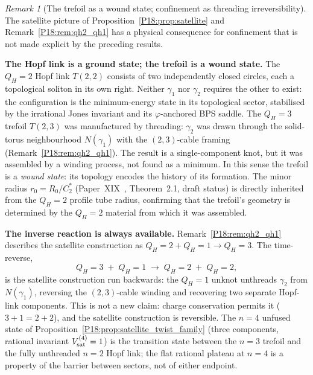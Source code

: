 \documentclass[11pt,a4paper]{article}
\theoremstyle{definition}\newtheorem{definition}[theorem]{Definition}
\theoremstyle{remark}
\newtheorem{remark}[theorem]{Remark}
\newcommand{\vp}{\varphi}
\newcommand{\QH}{Q_H}
\newcommand{\Jones}{V}
\begin{document}
\begin{remark}[The trefoil as a wound state; confinement as threading irreversibility]
\label{P18:rem:wound_state}
The satellite picture of Proposition~\ref{P18:prop:satellite} and
Remark~\ref{P18:rem:qh2_qh1} has a physical consequence for
confinement that is not made explicit by the preceding results.

\textbf{The Hopf link is a ground state; the trefoil is a wound state.}
The $\QH=2$ Hopf link $T(2,2)$ consists of two independently
closed circles, each a topological soliton in its own right.
Neither $\gamma_1$ nor $\gamma_2$ requires the other to exist:
the configuration is the minimum-energy state in its topological
sector, stabilised by the irrational Jones invariant and its
$\vp$-anchored BPS saddle.
The $\QH=3$ trefoil $T(2,3)$ was manufactured by threading:
$\gamma_2$ was drawn through the solid-torus neighbourhood
$N(\gamma_1)$ with the $(2,3)$-cable framing
(Remark~\ref{P18:rem:qh2_qh1}).  The result is a single-component
knot, but it was assembled by a winding process, not found as a
minimum.  In this sense the trefoil is a \emph{wound state}: its
topology encodes the history of its formation.  The minor radius
$r_0=R_0/C_2^*$ (Paper~XIX~\cite{Paper19}, Theorem~2.1, %
draft status) is directly inherited from the $\QH=2$
profile tube radius, confirming that the trefoil's geometry is
determined by the $\QH=2$ material from which it was assembled.

\textbf{The inverse reaction is always available.}
Remark~\ref{P18:rem:qh2_qh1} describes the satellite construction
as $\QH=2+\QH=1\to\QH=3$.  The time-reverse,
\begin{equation}
  \QH=3 \;+\; \QH=1 \;\longrightarrow\; \QH=2 \;+\; \QH=2,
  \label{P18:eq:reaction_inverse}
\end{equation}
is the satellite construction run backwards: the $\QH=1$ unknot
unthreads $\gamma_2$ from $N(\gamma_1)$, reversing the
$(2,3)$-cable winding and recovering two separate Hopf-link
components.  This is not a new claim: charge conservation permits
it ($3+1=2+2$), and the satellite construction is reversible.
The $n=4$ unfused state of Proposition~\ref{P18:prop:satellite_twist_family}
(three components, rational invariant $\Jones_{\rm sat}^{(4)}=1$)
is the transition state between the $n=3$ trefoil and the fully
unthreaded $n=2$ Hopf link; the flat rational plateau at $n=4$
is a property of the barrier between sectors, not of either
endpoint.


\end{remark}
\end{document}
